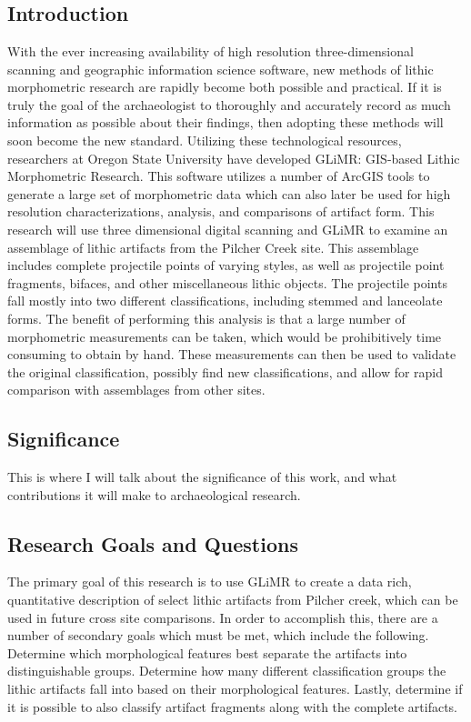 \chapter{}

\section{Introduction}
	With the ever increasing availability of high resolution three-dimensional scanning and geographic information science software, new methods of lithic morphometric research are rapidly become both possible and practical. If it is truly the goal of the archaeologist to thoroughly and accurately record as much information as possible about their findings, then adopting these methods will soon become the new standard. Utilizing these technological resources, researchers at Oregon State University have developed GLiMR: GIS-based Lithic Morphometric Research. This software utilizes a number of ArcGIS tools to generate a large set of morphometric data which can also later be used for high resolution characterizations, analysis, and comparisons of artifact form.
	This research will use three dimensional digital scanning and GLiMR to examine an assemblage of lithic artifacts from the Pilcher Creek site. This assemblage includes complete projectile points of varying styles, as well as projectile point fragments, bifaces, and other miscellaneous lithic objects. The projectile points fall mostly into two different classifications, including stemmed and lanceolate forms. The benefit of performing this analysis is that a large number of morphometric measurements can be taken, which would be prohibitively time consuming to obtain by hand. These measurements can then be used to validate the original classification, possibly find new classifications, and allow for rapid comparison with assemblages from other sites.

\section{Significance}
	This is where I will talk about the significance of this work, and what contributions it will make to archaeological research.

\section{Research Goals and Questions}
	The primary goal of this research is to use GLiMR to create a data rich, quantitative description of select lithic artifacts from Pilcher creek, which can be used in future cross site comparisons. In order to accomplish this, there are a number of secondary goals which must be met, which include the following. Determine which morphological features best separate the artifacts into distinguishable groups. Determine how many different classification groups the lithic artifacts fall into based on their morphological features. Lastly, determine if it is possible to also classify artifact fragments along with the complete artifacts.
